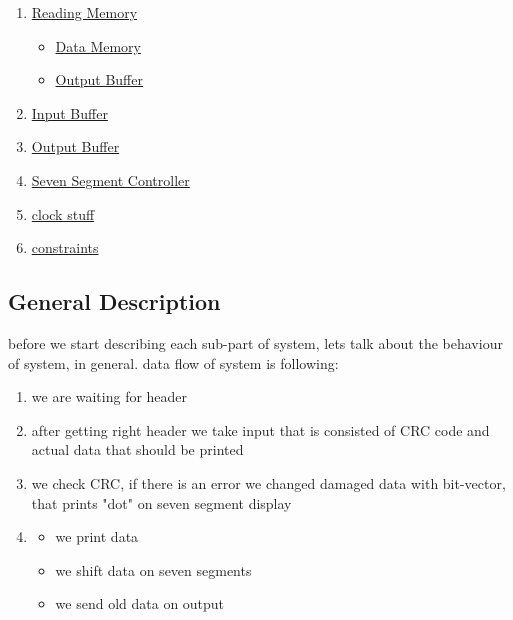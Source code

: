 \documentclass{article}
\begin{document}
\begin{enumerate}
  \item \href{run:./vhd/ReadingMemory.vhd}{Reading Memory}
    \begin{itemize}
        \item \href{run:./vhd/DataMemory.vhd}{Data Memory} 
        \item \href{run:./vhd/OutBuffer.vhd}{Output Buffer}
    \end{itemize}
  \item \href{run:./vhd/InBuffer.vhd}{Input Buffer}
  \item \href{run:./vhd/OutBuffer.vhd}{Output Buffer}
  \item \href{run:./vhd/SevSeg.vhd}{Seven Segment Controller}
  \item \href{run:./vhd/ClockStuff.vhd}{clock stuff}
  \item \href{run:./vhd/constr.ucf}{constraints} 
\end{enumerate}




\vfill
\subsection{General Description}
before we start describing each sub-part of system, lets talk about the behaviour of system, in general. data flow of system is following:
\begin{enumerate}
    \item we are waiting for header
    \item after getting right header we take input that is consisted of CRC code and actual data that should be printed
    \item we check CRC, if there is an error we changed damaged data with    bit-vector, that prints "dot" on seven segment display
    \item 
        \begin{itemize}
        \item we print data
        \item we shift data on seven segments
        \item we send old data on output
        \end{itemize}
\end{enumerate}
\end{document}
